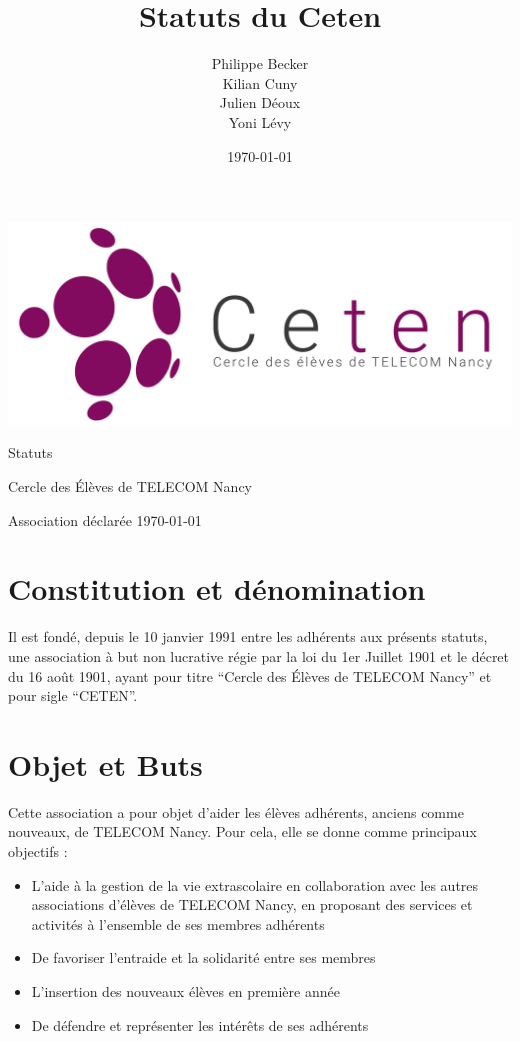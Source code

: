 \documentclass{article} %
\title{Statuts du Ceten}
\author{Philippe Becker\\
	Kilian Cuny\\
	Julien Déoux\\
	Yoni Lévy}
\date\today
\begin{document}

	
	\begin{titlepage}
		\begin{center}
			\includegraphics[width=\textwidth]{images/ceten.png}\par
			\vspace{3cm}
			{\Huge \light Statuts}\par
			\vfill
			{\large Cercle des Élèves de TELECOM Nancy}\par
			{\large \light Association déclarée}
			\vfill
			{\light \today}\par
		\end{center}
	\end{titlepage}

	



	\section{Constitution et dénomination}
		Il est fondé, depuis le 10 janvier 1991 entre les adhérents aux présents
		statuts, une association à but non lucrative régie par la loi du 1er Juillet
		1901 et le décret du 16 août 1901, ayant pour titre “Cercle des Élèves de
		TELECOM Nancy” et pour sigle “CETEN”.

	\section{Objet et Buts}
		Cette association a pour objet d’aider les élèves adhérents, anciens comme
		nouveaux, de TELECOM Nancy. Pour cela, elle se donne comme principaux
		objectifs :
		\begin{itemize}
			\item L’aide à la gestion de la vie extrascolaire en collaboration avec
			    les autres associations d'élèves de TELECOM Nancy, en proposant des
			    services et activités à l’ensemble de ses membres adhérents
			\item De favoriser l’entraide et la solidarité entre ses membres
			\item L’insertion des nouveaux élèves en première année
			\item De défendre et représenter les intérêts de ses adhérents
		\end{itemize}
\end{document}
